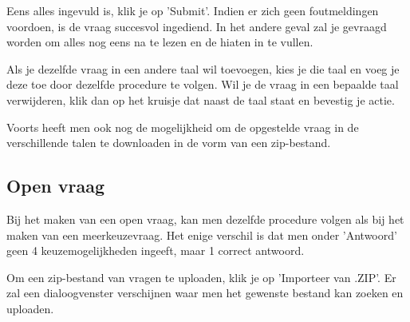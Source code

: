 \documentclass[]{article}
\begin{document}
Eens alles ingevuld is, klik je op 'Submit'. Indien er zich geen foutmeldingen voordoen, is de vraag succesvol ingediend. In het andere geval zal je gevraagd worden om alles nog eens na te lezen en de hiaten in te vullen.

Als je dezelfde vraag in een andere taal wil toevoegen, kies je die taal en voeg je deze toe door dezelfde procedure te volgen. Wil je de vraag in een bepaalde taal verwijderen, klik dan op het kruisje dat naast de taal staat en bevestig je actie. 

Voorts heeft men ook nog de mogelijkheid om de opgestelde vraag in de verschillende talen te downloaden in de vorm van een zip-bestand. 

\subsection{Open vraag}

Bij het maken van een open vraag, kan men dezelfde procedure volgen als bij het maken van een meerkeuzevraag. Het enige verschil is dat men onder 'Antwoord' geen 4 keuzemogelijkheden ingeeft, maar 1 correct antwoord.

Om een zip-bestand van vragen te uploaden, klik je op 'Importeer van .ZIP'. Er zal een dialoogvenster verschijnen waar men het gewenste bestand kan zoeken en uploaden.
\end{document}
